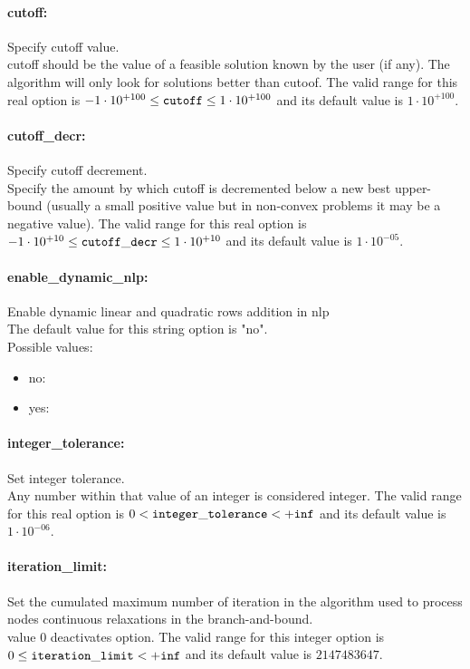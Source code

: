 \paragraph{cutoff:}\label{sec:cutoff} Specify cutoff value. $\;$ \\
 cutoff should be the value of a feasible solution
known by the user (if any). The algorithm will
only look for solutions better than cutoof. The valid range for this real option is 
$-1 \cdot 10^{+100} \le {\tt cutoff } \le 1 \cdot 10^{+100}$
and its default value is $1 \cdot 10^{+100}$.


\paragraph{cutoff\_decr:}\label{sec:cutoff_decr} Specify cutoff decrement. $\;$ \\
 Specify the amount by which cutoff is decremented
below a new best upper-bound (usually a small
positive value but in non-convex problems it may
be a negative value). The valid range for this real option is 
$-1 \cdot 10^{+10} \le {\tt cutoff\_decr } \le 1 \cdot 10^{+10}$
and its default value is $1 \cdot 10^{-05}$.


\paragraph{enable\_dynamic\_nlp:}\label{sec:enable_dynamic_nlp} Enable dynamic linear and quadratic rows addition in nlp $\;$ \\

The default value for this string option is "no".
\\ 
Possible values:
\begin{itemize}
   \item no: 
   \item yes: 
\end{itemize}

\paragraph{integer\_tolerance:}\label{sec:integer_tolerance} Set integer tolerance. $\;$ \\
 Any number within that value of an integer is
considered integer. The valid range for this real option is 
$0 <  {\tt integer\_tolerance } <  {\tt +inf}$
and its default value is $1 \cdot 10^{-06}$.


\paragraph{iteration\_limit:}\label{sec:iteration_limit} Set the cumulated maximum number of iteration in the algorithm used to process nodes continuous relaxations in the branch-and-bound. $\;$ \\
 value 0 deactivates option. The valid range for this integer option is
$0 \le {\tt iteration\_limit } <  {\tt +inf}$
and its default value is $2147483647$.


